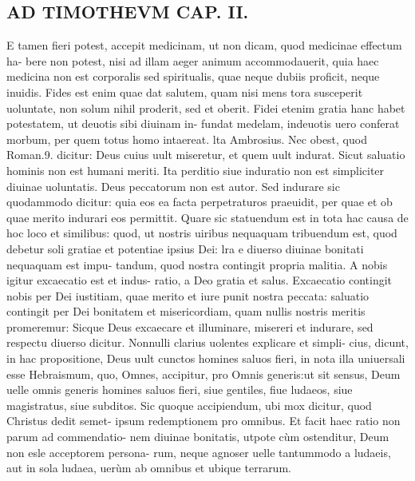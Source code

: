 \documentclass{article}
\begin{document}
\begin{pages}
\section*{AD TIMOTHEVM CAP. II. }
\marginpar{[ p.67 ]}\pstart E tamen fieri potest, accepit medicinam, ut non dicam, quod medicinae effectum ha- bere non potest, nisi ad illam aeger animum accommodauerit, quia haec medicina non est corporalis sed spiritualis, quae neque dubiis proficit, neque inuidis. Fides est enim quae dat salutem, quam nisi mens tora susceperit uoluntate, non solum nihil proderit, sed et oberit. Fidei etenim gratia hanc habet potestatem, ut deuotis sibi diuinam in- fundat medelam, indeuotis uero conferat morbum, per quem totus homo intaereat. lta Ambrosius. Nec obest, quod Roman.9. dicitur: Deus cuius uult miseretur, et quem uult indurat. Sicut saluatio hominis non est humani meriti. Ita perditio siue induratio non est simpliciter diuinae uoluntatis. Deus peccatorum non est autor. Sed indurare sic quodammodo dicitur: quia eos ea facta perpetraturos praeuidit, per quae et ob quae merito indurari eos permittit. Quare sic statuendum est in tota hac causa de hoc loco et similibus: quod, ut nostris uiribus nequaquam tribuendum est, quod debetur soli gratiae et potentiae ipsius Dei: lra e diuerso diuinae bonitati nequaquam est impu- tandum, quod nostra contingit propria malitia. A nobis igitur excaecatio est et indus- ratio, a Deo gratia et salus. Excaecatio contingit nobis per Dei iustitiam, quae merito et iure punit nostra peccata: saluatio contingit per Dei bonitatem et misericordiam, quam nullis nostris meritis promeremur: Sicque  Deus excaecare et illuminare, misereri et indurare, sed respectu diuerso dicitur. Nonnulli clarius uolentes explicare et simpli- cius, dicunt, in hac propositione, Deus uult cunctos homines saluos fieri, in nota illa uniuersali esse Hebraismum, quo, Omnes, accipitur, pro Omnis generis:ut sit sensus, Deum uelle omnis generis homines saluos fieri, siue gentiles, fiue ludaeos, siue magistratus, siue subditos. Sic quoque accipiendum, ubi mox dicitur, quod Christus dedit semet- ipsum redemptionem pro omnibus. Et facit haec ratio non parum ad commendatio- nem diuinae bonitatis, utpote cùm ostenditur, Deum non esle acceptorem persona- rum, neque agnoser uelle tantummodo a ludaeis, aut in sola ludaea, uerùm ab omnibus et ubique terrarum.  \pend
{}
{}

\end{pages}
\end{document}
